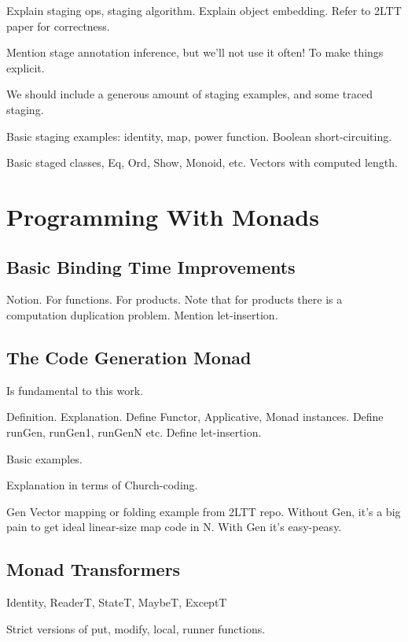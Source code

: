 \documentclass[acmsmall,screen,review,anonymous]{acmart}
\begin{document}
Explain staging ops, staging algorithm. Explain object embedding. Refer to 2LTT
paper for correctness.

Mention stage annotation inference, but we'll not use it often! To make things
explicit.

We should include a generous amount of staging examples, and some traced staging.

Basic staging examples: identity, map, power function. Boolean short-circuiting.

Basic staged classes, Eq, Ord, Show, Monoid, etc. Vectors with computed length.

\section{Programming With Monads}\label{sec:programming-with-monads}

\subsection{Basic Binding Time Improvements}\label{sec:basic-binding-time-improvements}

Notion.
For functions.
For products.
Note that for products there is a computation duplication problem.
Mention let-insertion.

\subsection{The Code Generation Monad}\label{sec:the-code-generation-monad}

Is fundamental to this work.

Definition. Explanation. Define Functor, Applicative, Monad instances.
Define runGen, runGen1, runGenN etc. Define let-insertion.

Basic examples.

Explanation in terms of Church-coding.

Gen Vector mapping or folding example from 2LTT repo. Without Gen, it's a
big pain to get ideal linear-size map code in N. With Gen it's easy-peasy.

\subsection{Monad Transformers}\label{sec:monad-transformers}

Identity, ReaderT, StateT, MaybeT, ExceptT

Strict versions of put, modify, local, runner functions.
\end{document}
